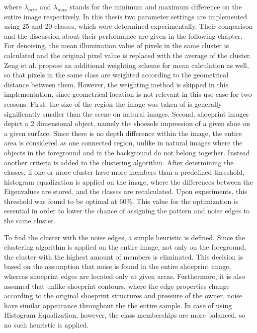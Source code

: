 \documentclass[draft,final]{vutinfth} %
\begin{document}
where $\lambda_{min}$ and $\lambda_{max}$ stands for the minimum and maximum difference on the entire image respectively.
In this thesis two parameter settings are implemented using 25 and 20 classes, which were determined experimentally.
Their comparison and the discussion about their performance are given in the following chapter.
For denoising, the mean illumination value of pixels in the same cluster is calculated and the original pixel value is replaced with the average of the cluster.
Zeng et al. \cite{zeng2011region} propose an additional weighting scheme for mean calculation as well, so that pixels in the same class are weighted according to the geometrical distance between them.
However, the weighting method is skipped in this implementation, since geometrical location is not relevant in this use-case for two reasons.
First, the size of the region the image was taken of is generally significantly smaller than the scene on natural images.
Second, shoeprint images depict a 2 dimensional object, namely the shoesole impression of a given shoe on a given surface. 
Since there is no depth difference within the image, the entire area is considered as one connected region, unlike in natural images where the objects in the foreground and in the background do not belong together.
Instead another criteria is added to the clustering algorithm.
After determining the classes, if one or more cluster have more members than a predefined threshold, histogram equalization is applied on the image, where the differences between the Eigenvalues are stored, and the classes are recalculated.
Upon experiments, this threshold was found to be optimal at 60\%.
This value for the optimization is essential in order to lower the chance of assigning the pattern and noise edges to the same cluster. 
\par
To find  the cluster with the noise edges, a simple heuristic is defined.
Since the clustering algorithm is applied on the entire image, not only on the foreground, the cluster with the highest amount of members is eliminated.
This decision is based on the assumption that noise is found in the entire shoeprint image, whereas shoeprint edges are located only at given areas.
Furthermore, it is also assumed that unlike shoeprint contours, where the edge properties change according to the original shoeprint structures and pressure of the owner, noise have similar appearance throughout the the entire sample.
In case of using Histogram Equalization, however, the class memberships are more balanced, so no such heuristic is applied.
\par
\end{document}
